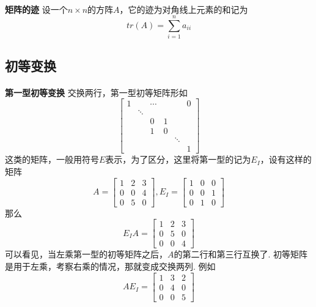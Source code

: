\paragraph{}
\textbf{矩阵的迹} \: 设一个$n\times n$的方阵$A$，它的迹为对角线上元素的和记为
$$
tr(A) = \sum_{i = 1}^n a_{ii}
$$


\subsection{初等变换}
\paragraph{}
\textbf{第一型初等变换} \: 交换两行，第一型初等矩阵形如
$$
 \begin{bmatrix}
   1 &  & \cdots &  &  & 0 \\
    & \ddots & &  & & \\
    &  & 0 & 1 &  & \\
    & & 1 & 0 & &  \\
    &   & & & \ddots & \\
    & & & & & 1 
  \end{bmatrix}
$$ 
这类的矩阵，一般用符号$E$表示，为了区分，这里将第一型的记为$E_{I}$，设有这样的矩阵
$$
A =  \begin{bmatrix}
    1 & 2 & 3 \\
    0 & 0 & 4 \\
    0 & 5 & 0
  \end{bmatrix}, E_{I} = \begin{bmatrix}
    1 & 0 & 0 \\
    0 & 0 & 1 \\
    0 & 1 & 0  
  \end{bmatrix}
$$
那么
$$
E_{I}A = \begin{bmatrix}
    1 & 2 & 3 \\
    0 & 5 & 0 \\
    0 & 0 & 4
  \end{bmatrix}
$$
可以看见，当左乘第一型的初等矩阵之后，$A$的第二行和第三行互换了.  初等矩阵是用于左乘，考察右乘的情况，那就变成交换两列. 例如
$$
AE_{I} = \begin{bmatrix}
    1 & 3 & 2 \\
    0 & 4 & 0 \\
    0 & 0 & 5
  \end{bmatrix}
$$

